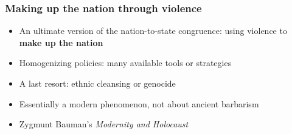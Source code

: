 \documentclass[aspectratio=43, handout]{beamer}
\begin{document}
\begin{frame}
\frametitle{Making up the nation through violence}
\centering

\begin{itemize}
  \item An ultimate version of the nation-to-state congruence: using violence to \textbf{make up the nation}
  \item Homogenizing policies: many available tools or strategies
  \item A last resort: ethnic cleansing or genocide
  \item Essentially a modern phenomenon, not about ancient barbarism
  \item Zygmunt Bauman's \textit{Modernity and Holocaust}
\end{itemize}

\end{frame}
\end{document}
